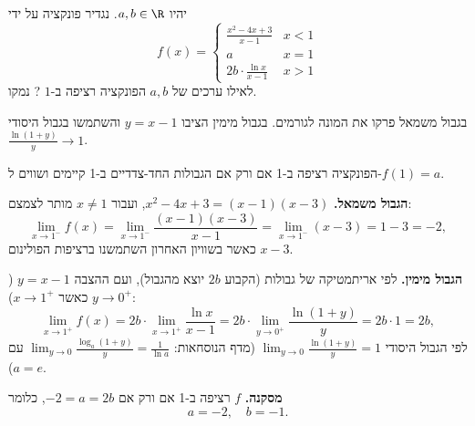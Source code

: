 
\begin{question}
יהיו $a,b\in\R$. נגדיר פונקציה על ידי
\[
f(x)=\begin{cases}
\frac{x^2-4x+3}{x-1} & x<1\\
a & x=1\\
2b\cdot\frac{\ln x}{x-1} & x>1
\end{cases}
\]
לאילו ערכים של $a,b$ הפונקציה רציפה ב-$1$ ? נמקו.
\end{question}

\begin{hint}
בגבול משמאל פרקו את המונה לגורמים. בגבול מימין הציבו $y=x-1$ והשתמשו בגבול היסודי $\frac{\ln(1+y)}{y}\to1$.
\end{hint}

\begin{solution}
הפונקציה רציפה ב-1 אם ורק אם הגבולות החד-צדדיים ב-1 קיימים ושווים ל-$f(1)=a$.

\textbf{הגבול משמאל.} $x^2-4x+3=(x-1)(x-3)$, ועבור $x\neq1$ מותר לצמצם:
\[
\lim_{x\to1^-}f(x)=\lim_{x\to1^-}\frac{(x-1)(x-3)}{x-1}=\lim_{x\to1^-}(x-3)=1-3=-2 ,
\]
כאשר בשוויון האחרון השתמשנו ברציפות הפולינום $x-3$.

\textbf{הגבול מימין.} לפי אריתמטיקה של גבולות (הקבוע $2b$ יוצא מהגבול), ועם ההצבה $y=x-1$ ($y\to0^+$ כאשר $x\to1^+$):
\[
\lim_{x\to1^+}f(x)=2b\cdot\lim_{x\to1^+}\frac{\ln x}{x-1}=2b\cdot\lim_{y\to0^+}\frac{\ln(1+y)}{y}=2b\cdot1=2b ,
\]
לפי הגבול היסודי $\lim_{y\to0}\frac{\ln(1+y)}{y}=1$ (מדף הנוסחאות: $\lim_{y\to0}\frac{\log_a(1+y)}{y}=\frac{1}{\ln a}$ עם $a=e$).

\textbf{מסקנה.} $f$ רציפה ב-1 אם ורק אם $-2=a=2b$, כלומר
\[
\boxed{a=-2,\quad b=-1.}
\]
\end{solution}
